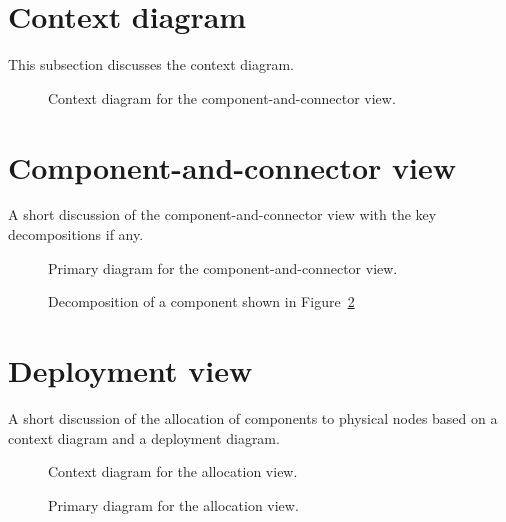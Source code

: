 \documentclass[english]{sareport}
\begin{document}
\section{Context diagram}
This subsection discusses the context diagram.

\begin{figure}[!htp]
	\centering
	\caption{Context diagram for the component-and-connector view.
	}\label{fig:cc_context}
\end{figure}

\section{Component-and-connector view}
A short discussion of the component-and-connector view with the key
decompositions if any.

\begin{figure}[!htp]
	\centering
	\caption{Primary diagram for the component-and-connector view.
	}\label{fig:cc_main}
\end{figure}

\begin{figure}[!htp]
	\centering
	\caption{Decomposition of a component shown in Figure~\ref{fig:cc_main}
	}\label{fig:decomp_decomp1}
\end{figure}

\section{Deployment view}
A short discussion of the allocation of components to physical nodes based on a
context diagram and a deployment diagram.

\begin{figure}[!htp]
	\centering
	\caption{Context diagram for the allocation view.}\label{fig:depl_context}
\end{figure}

\begin{figure}[!htp]
	\centering
	\caption{Primary diagram for the allocation view.}\label{fig:depl_main}
\end{figure}
\end{document}
